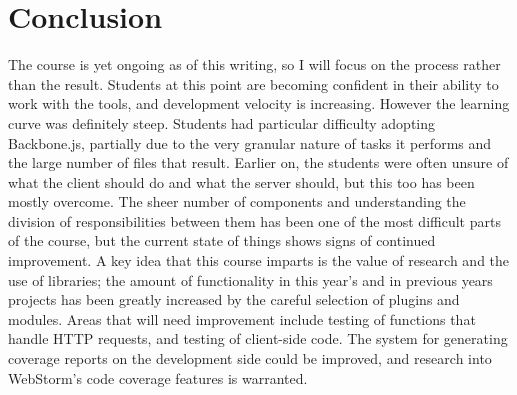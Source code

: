 \documentclass[12pt]{article}
\begin{document}
\section{Conclusion}\label{sec:conclusion}
The course is yet ongoing as of this writing, so I will focus on the process rather than the result. Students at this point are becoming confident in their ability to work with the tools, and development velocity is increasing. However the learning curve was definitely steep. Students had particular difficulty adopting Backbone.js, partially due to the very granular nature of tasks it performs and the large number of files that result. Earlier on, the students were often unsure of what the client should do and what the server should, but this too has been mostly overcome. The sheer number of components and understanding the division of responsibilities between them has been one of the most  difficult parts of the course, but the current state of things shows signs of continued improvement. A key idea that this course imparts is the value of research and the use of libraries; the amount of functionality in this year's and in previous years projects has been greatly increased by the careful selection of plugins and modules. Areas that will need improvement include testing of functions that handle HTTP requests, and testing of client-side code. The system for generating coverage reports on the development side could be improved, and research into WebStorm's code coverage features is warranted.



%
%




%  
%
%


\end{document}

